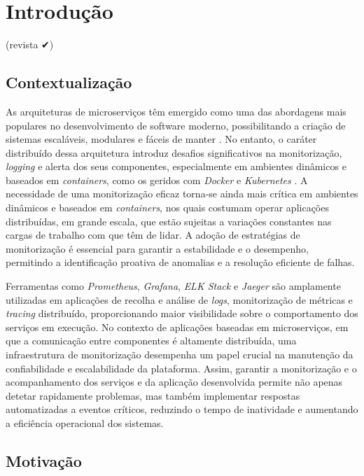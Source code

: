 \chapter{Introdução}

(revista ✔)

\section{Contextualização}

As arquiteturas de microserviços têm emergido como uma das abordagens mais populares no desenvolvimento de software moderno, possibilitando a criação de sistemas escaláveis, modulares e fáceis de manter \cite{Larrucea2018}. No entanto, o caráter distribuído dessa arquitetura introduz desafios significativos na monitorização, \textit{logging} e alerta dos seus componentes, especialmente em ambientes dinâmicos e baseados em \textit{containers}, como os geridos com \textit{Docker} e \textit{Kubernetes} \cite{Liu2020}. A necessidade de uma monitorização eficaz torna-se ainda mais crítica em ambientes dinâmicos e baseados em \textit{containers}, nos quais costumam operar aplicações distribuídas, em grande escala, que estão sujeitas a variações constantes nas cargas de trabalho com que têm de lidar. A adoção de estratégias de monitorização é essencial para garantir a estabilidade e o desempenho, permitindo a identificação proativa de anomalias e a resolução eficiente de falhas.

Ferramentas como \textit{Prometheus}, \textit{Grafana}, \textit{ELK Stack} e \textit{Jaeger} são amplamente utilizadas em aplicações de recolha e análise de \textit{logs}, monitorização de métricas e \textit{tracing} distribuído, proporcionando maior visibilidade sobre o comportamento dos serviços em execução. No contexto de aplicações baseadas em microserviços, em que a comunicação entre componentes é altamente distribuída, uma infraestrutura de monitorização desempenha um papel crucial na manutenção da confiabilidade e escalabilidade da plataforma. Assim, garantir a monitorização e o acompanhamento dos serviços e da aplicação desenvolvida permite não apenas detetar rapidamente problemas, mas também implementar respostas automatizadas a eventos críticos, reduzindo o tempo de inatividade e aumentando a eficiência operacional dos sistemas.



\section{Motivação}

